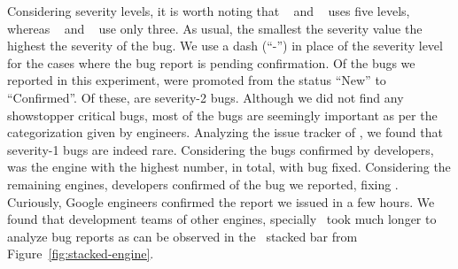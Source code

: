 \documentclass[10pt,conference,anonymous]{IEEEtran}
\begin{document}


Considering severity levels, it is worth noting that \jsc{}~\cite{jsc-severity} 
and \smonkey{}~\cite{mozilla-severity} uses five levels, 
whereas \chakra{}~\cite{chakra-severity} and \veight{}~\cite{v8-severity} 
use only three. As usual, the smallest the severity value the 
highest the severity of the bug. We use a dash (``-'') 
in place of the severity level for the cases where the bug 
report is pending confirmation. Of
the  bugs we reported in this experiment,  were
promoted from the status ``New'' to ``Confirmed''. Of these, 
are severity-2 bugs.  Although we did not find any showstopper
critical bugs, most of the bugs are seemingly important as per the
categorization given by engineers. Analyzing the issue tracker of
\chakra, we found that severity-1 bugs are indeed rare. Considering
the bugs confirmed by developers, \chakra{} was the engine with the
highest number,  in total, with  bug fixed. Considering
the remaining engines, \veight{} developers confirmed  of the
 bug we reported, fixing . Curiously, Google
engineers confirmed the report we issued in a few hours. We found that
development teams of other engines, specially \jsc\, took much longer
to analyze bug reports as can be observed in the \jsc\ stacked bar
from Figure~\ref{fig:stacked-engine}.


\begin{center}
\end{center}
\end{document}
